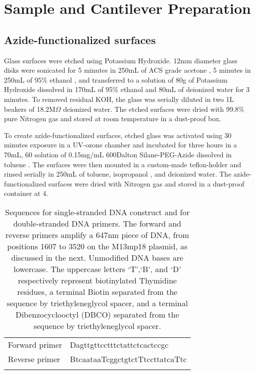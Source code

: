 \chapter{Sample and Cantilever Preparation}

\section{Azide-functionalized surfaces}

\firstp Glass surfaces were etched using Potassium Hydroxide. 12mm diameter glass disks  were sonicated  for 5 minutes in 250mL of ACS grade acetone , 5 minutes in 250mL of 95\% ethanol , and transferred to a solution of 80g of Potassium Hydroxide  dissolved in  170mL of 95\% ethanol and 80mL of deionized water  for 3 minutes. To removed residual KOH, the glass was serially diluted in two 1L beakers of 18.2M$\Omega$ deionized water. The etched surfaces were dried with 99.8\% pure Nitrogen gas  and stored at room temperature in a dust-proof box. \pl

To create azide-functionalized surfaces, etched glass was activated using 30 minutes exposure in a UV-ozone chamber  and incubated for three hours in a 70mL, 60\degreeC{} solution of 0.15mg/mL 600Dalton Silane-PEG-Azide  dissolved in toluene . The surfaces were then mounted in a custom-made teflon-holder and rinsed serially in 250mL of toluene, isopropanol , and deionized water. The azide-functionalized surfaces were dried with Nitrogen gas and stored in a dust-proof container at 4\degreeC{}. \pl 


\begin{table}[htp]
\caption[DNA primer sequences]{Sequences for single-stranded DNA construct and for double-stranded DNA primers. The forward and reverse primers amplify a 647nm piece of DNA, from positions 1607 to 3520 on the M13mp18 plasmid, as discussed in the next. Unmodified DNA bases are lowercase. The uppercase letters `T',`B', and `D' respectively represent biotinylated Thymidine residues, a terminal Biotin separated from the sequence by triethyleneglycol spacer, and a terminal Dibenzocyclooctyl (DBCO) separated from the sequence by triethyleneglycol spacer.}
\begin{tabularx}{\textwidth}{ l | l  }
\hline \hline
Forward primer & Dagttgttcctttctattctcactccgc \\ \e 
Reverse primer & BtcaataaTcggctgtctTtccttatcaTtc \\ \e 
\end{tabularx}
\end{table}

